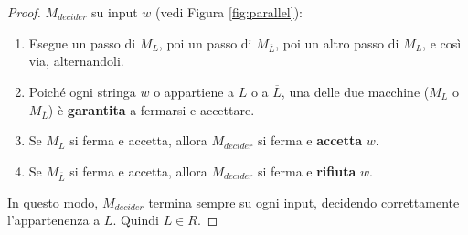 \documentclass[a4paper]{article}
\theoremstyle{definition} %
\theoremstyle{remark} %
\begin{document}
\begin{proof}
$M_{decider}$ su input $w$ (vedi Figura \ref{fig:parallel}):
\begin{enumerate}
    \item Esegue un passo di $M_L$, poi un passo di $M_{\overline{L}}$, poi un altro passo di $M_L$, e così via, alternandoli.
    \item Poiché ogni stringa $w$ o appartiene a $L$ o a $\overline{L}$, una delle due macchine ($M_L$ o $M_{\overline{L}}$) è \textbf{garantita} a fermarsi e accettare.
    \item Se $M_L$ si ferma e accetta, allora $M_{decider}$ si ferma e \textbf{accetta} $w$.
    \item Se $M_{\overline{L}}$ si ferma e accetta, allora $M_{decider}$ si ferma e \textbf{rifiuta} $w$.
\end{enumerate}
In questo modo, $M_{decider}$ termina sempre su ogni input, decidendo correttamente l'appartenenza a $L$. Quindi $L \in R$.
\end{proof}
\end{document}
